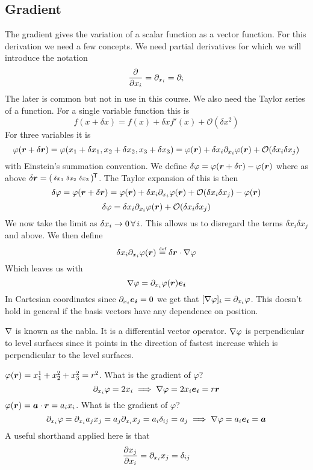 \documentclass{article}
\newcommand{\defeq}{\overset{\text{\tiny def}}{=}}
\newcommand{\pdvx}[1]{\partial_{x_{#1}}}
\begin{document}
    \subsection{Gradient}
    The gradient gives the variation of a scalar function as a vector function.
    For this derivation we need a few concepts.
    We need partial derivatives for which we will introduce the notation
    \[\pdv{x_i} = \pdvx i = \partial_i\]
    The later is common but not in use in this course.
    We also need the Taylor series of a function.
    For a single variable function this is
    \[f(x + \delta x) = f(x) + \delta xf'(x) + \mathcal{O}(\delta x^2)\]
    For three variables it is
    \[\varphi(\vv r + \delta\vv r) = \varphi(x_1 + \delta x_1, x_2 + \delta x_2, x_3 + \delta x_3) = \varphi(\vv r) + \delta x_i\pdvx{i}\varphi(\vv r) + \mathcal{O}(\delta x_i\delta x_j)\]
    with Einstein's summation convention.
    We define \(\delta \varphi = \varphi(\bm{r} + \delta r) - \varphi(\bm{r})\) where as above 
    \(\delta\bm{r} = (
    \begin{smallmatrix}
        \delta x_1 & \delta x_2 & \delta x_3
    \end{smallmatrix}
    )^{\mkern-1.5mu\mathsf{T}}\).
    The Taylor expansion of this is then
    \[\delta\varphi = \varphi(\vv r + \delta\vv r) = \varphi(\vv r) + \delta x_i\pdvx{i}\varphi(\vv r) + \mathcal{O}(\delta x_i\delta x_j) - \varphi(\vv r)\]
    \[\delta\varphi = \delta x_i\pdvx{i}\varphi(\vv r) + \mathcal{O}(\delta x_i\delta x_j)\]
    We now take the limit as \(\delta x_i\to 0 \,\forall\, i\).
    This allows us to disregard the terms \(\delta x_i\delta x_j\) and above.
    We then define
    \[\delta x_i\pdvx{i}\varphi(\vv r) \defeq \delta\vv r\cdot\grad\varphi\]
    Which leaves us with
    \[\grad\varphi = \pdvx{i}\varphi(\vv r)\ve i\]
    In Cartesian coordinates since \(\pdvx i \ve i = 0\) we get that \([\grad\varphi]_i = \pdvx i\varphi\).
    This doesn't hold in general if the basis vectors have any dependence on position.
    
    \(\nabla\) is known as the nabla.
    It is a differential vector operator.
    \(\nabla \varphi\) is perpendicular to level surfaces since it points in the direction of fastest increase which is perpendicular to the level surfaces.
    
    \example
    \(\varphi(\bm{r}) = x_1^1 + x_2^2 + x_3^2 = r^2\).
    What is the gradient of \(\varphi\)?
    \[\pdvx i \varphi = 2x_i \implies \grad\varphi = 2x_i\ve i = r\vv r\]
    \(\varphi(\bm{r}) = \bm{a}\cdot\bm{r} = a_ix_i\).
    What is the gradient of \(\varphi\)?
    \[\pdvx i \varphi = \pdvx i a_jx_j = a_j\pdvx i x_j = a_i\delta_{ij} = a_j \implies \grad \varphi = a_i\ve i = \vv a\]
    A useful shorthand applied here is that
    \[\pdv{x_j}{x_i} = \pdvx i x_j = \delta_{ij}\]
    
\end{document}
